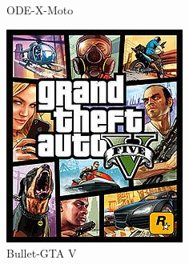 \begin{figure}[h]
\begin{subfigure}[b]{0.24\linewidth}
    \caption{ODE-X-Moto}
    \end{subfigure}
    \begin{subfigure}[b]{0.24\linewidth}
    \includegraphics[width=\linewidth]{./resources/physics/bullet(2).png}
    \caption{Bullet-GTA V}
    \end{subfigure}
    \begin{subfigure}[b]{0.24\linewidth}

\end{subfigure}
\end{figure}
